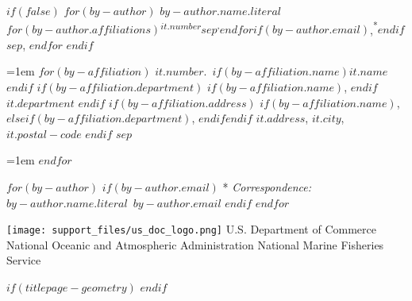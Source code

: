\begin{minipage}[b][\textheight][s]{\textwidth}
$if(false)$
  $for(by-author)$
    {$by-author.name.literal$}$for(by-author.affiliations)${\textsuperscript{$it.number$}}$sep${\textsuperscript{,}}$endfor$$if(by-author.email)$,{\textsuperscript{*}}$endif$$sep$,
$endfor$
$endif$

\vspace{2\baselineskip}

\hangindent=1em
$for(by-affiliation)$%
{$it.number$}.~$if(by-affiliation.name)${$it.name$}$endif$%
$if(by-affiliation.department)$%
$if(by-affiliation.name)$, $endif$%
{$it.department$}%
$endif$%
$if(by-affiliation.address)$%
$if(by-affiliation.name)$, $else$$if(by-affiliation.department)$, $endif$$endif$%
{$it.address$, $it.city$, $it.postal-code$}%
$endif$%
$sep$\par\hangindent=1em%
$endfor$

\vspace{1\baselineskip}

$for(by-author)$
$if(by-author.email)$
* \textit{Correspondence:}~$by-author.name.literal$~$by-author.email$
$endif$
$endfor$


\vfill


\vspace{1\baselineskip}

\texttt{[image: support\_files/us\_doc\_logo.png]}\newline %
U.S. Department of Commerce\newline
National Oceanic and Atmospheric Administration\newline
National Marine Fisheries Service\newline

\end{minipage}
$if(titlepage-geometry)$
\restoregeometry
$endif$
